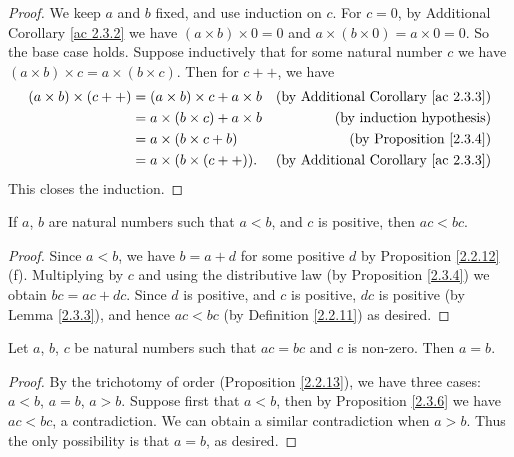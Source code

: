 \begin{proof}
    We keep \(a\) and \(b\) fixed, and use induction on \(c\).
    For \(c = 0\), by Additional Corollary \ref{ac 2.3.2} we have \((a \times b) \times 0 = 0\) and \(a \times (b \times 0) = a \times 0 = 0\).
    So the base case holds.
    Suppose inductively that for some natural number \(c\) we have \((a \times b) \times c = a \times (b \times c)\).
    Then for \(c++\), we have
    \begin{align*}
        (a \times b) \times (c++) & = (a \times b) \times c + a \times b & \text{(by Additional Corollary \ref{ac 2.3.3})} \\
                                  & = a \times (b \times c) + a \times b & \text{(by induction hypothesis)}                \\
                                  & = a \times (b \times c + b)          & \text{(by Proposition \ref{2.3.4})}             \\
                                  & = a \times (b \times (c++)).         & \text{(by Additional Corollary \ref{ac 2.3.3})}
    \end{align*}
    This closes the induction.
\end{proof}

\begin{proposition}\label{2.3.6}
    If \(a\), \(b\) are natural numbers such that \(a < b\), and \(c\) is positive, then \(ac < bc\).
\end{proposition}

\begin{proof}
    Since \(a < b\), we have \(b = a + d\) for some positive \(d\) by Proposition \ref{2.2.12}(f).
    Multiplying by \(c\) and using the distributive law (by Proposition \ref{2.3.4}) we obtain \(bc = ac + dc\).
    Since \(d\) is positive, and \(c\) is positive, \(dc\) is positive (by Lemma \ref{2.3.3}), and hence \(ac < bc\) (by Definition \ref{2.2.11}) as desired.
\end{proof}

\begin{corollary}\label{2.3.7}
    Let \(a\), \(b\), \(c\) be natural numbers such that \(ac = bc\) and \(c\) is non-zero.
    Then \(a = b\).
\end{corollary}

\begin{proof}
    By the trichotomy of order (Proposition \ref{2.2.13}), we have three cases: \(a < b\), \(a = b\), \(a > b\).
    Suppose first that \(a < b\), then by Proposition \ref{2.3.6} we have \(ac < bc\), a contradiction.
    We can obtain a similar contradiction when \(a > b\).
    Thus the only possibility is that \(a = b\), as desired.
\end{proof}

